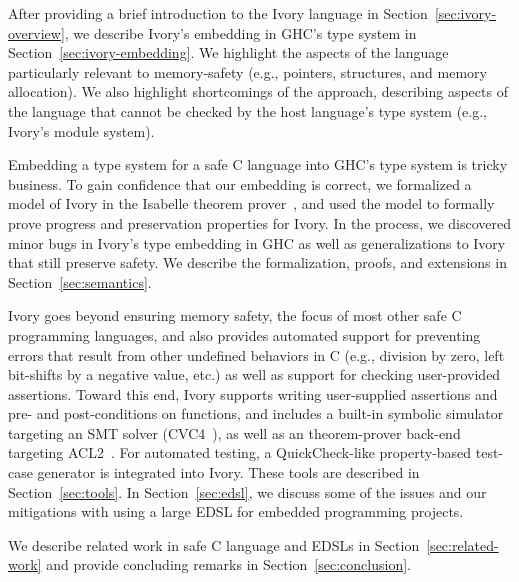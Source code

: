 After providing a brief introduction to the Ivory language in
Section~\ref{sec:ivory-overview}, we describe Ivory's embedding in GHC's type
system in Section~\ref{sec:ivory-embedding}. We highlight the aspects of the
language particularly relevant to memory-safety (e.g., pointers, structures, and
memory allocation). We also highlight shortcomings of the approach, describing
aspects of the language that cannot be checked by the host language's type
system (e.g., Ivory's module system).

Embedding a type system for a safe C language into GHC's type system is tricky
business. To gain confidence that our embedding is correct, we formalized a
model of Ivory in the Isabelle theorem prover~\cite{isabelle}, and used the model to
formally prove progress and preservation properties for Ivory. In the process,
we discovered minor bugs in Ivory's type embedding in GHC as well as
generalizations to Ivory that still preserve safety. We describe the
formalization, proofs, and extensions in Section~\ref{sec:semantics}.

Ivory goes beyond ensuring memory safety, the focus of most other safe C
programming languages, and also provides automated support for preventing errors
that result from other undefined behaviors in C (e.g., division by zero, left
bit-shifts by a negative value, etc.) as well as support for checking
user-provided assertions. Toward this end, Ivory supports writing user-supplied
assertions and pre- and post-conditions on functions, and includes a built-in
symbolic simulator targeting an SMT solver (CVC4~\cite{cvc4}), as well as an
theorem-prover back-end targeting ACL2~\cite{acl2}. For automated testing, a
QuickCheck-like property-based test-case generator is integrated into
Ivory. These tools are described in Section~\ref{sec:tools}. In
Section~\ref{sec:edsl}, we discuss some of the issues and our mitigations with
using a large EDSL for embedded programming projects.

We describe related work in safe C language and EDSLs in
Section~\ref{sec:related-work} and provide concluding remarks in
Section~\ref{sec:conclusion}.



